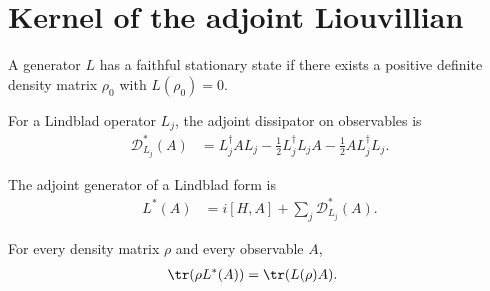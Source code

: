 \section{Kernel of the adjoint Liouvillian}
\label{sec:liouvillian_kernel}


\begin{definition}
    \label{def:has_faithful_stationary_state_ch12}
    \leanok
    A generator $L$ has a faithful stationary state if there exists a positive definite
    density matrix $\rho_0$ with $L(\rho_0)=0$.
\end{definition}

\begin{definition}
    \label{def:adjoint_dissipator_ch12}
    \leanok
    For a Lindblad operator $L_j$, the adjoint dissipator on observables is
    \begin{align}
        \mathcal{D}_{L_j}^*(A)
        &=L_j^\dagger A L_j
          -\tfrac12 L_j^\dagger L_j A
          -\tfrac12 A L_j^\dagger L_j.
        \label{eq:semigroup_adjoint_dissipator}
    \end{align}
\end{definition}

\begin{definition}
    \label{def:adjoint_generator_ch12}
    \leanok
    The adjoint generator of a Lindblad form is
    \begin{align}
        L^*(A)
        &=i[H,A]+\sum_j\mathcal{D}_{L_j}^*(A).
        \label{eq:semigroup_adjoint_generator}
    \end{align}
\end{definition}

\begin{theorem}
    \label{thm:trace_pairing_adjoint_generator_ch12}
    \leanok
    For every density matrix $\rho$ and every observable $A$,
    \begin{align}
        \tr(\rho L^*(A))
        &=\tr(L(\rho)A).
        \label{eq:semigroup_trace_pairing}
    \end{align}
\end{theorem}

